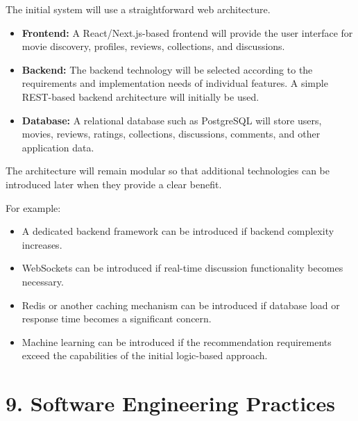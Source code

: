 \documentclass[11pt,a4paper]{article}
\begin{document}
The initial system will use a straightforward web architecture.

\begin{itemize}

    \item \textbf{Frontend:}
    A React/Next.js-based frontend will provide the user interface for movie discovery, profiles, reviews, collections, and discussions.

    \item \textbf{Backend:}
    The backend technology will be selected according to the requirements and implementation needs of individual features. A simple REST-based backend architecture will initially be used.

    \item \textbf{Database:}
    A relational database such as PostgreSQL will store users, movies, reviews, ratings, collections, discussions, comments, and other application data.

\end{itemize}

The architecture will remain modular so that additional technologies can be introduced later when they provide a clear benefit.

For example:

\begin{itemize}

    \item A dedicated backend framework can be introduced if backend complexity increases.

    \item WebSockets can be introduced if real-time discussion functionality becomes necessary.

    \item Redis or another caching mechanism can be introduced if database load or response time becomes a significant concern.

    \item Machine learning can be introduced if the recommendation requirements exceed the capabilities of the initial logic-based approach.

\end{itemize}



\section{9. Software Engineering Practices}
\end{document}

